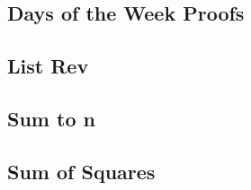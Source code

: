 
\subsection{Days of the Week Proofs} \label{days_proofs}


\newpage
\subsection{List Rev} \label{list_rev}


%

\newpage
\subsection{Sum to n} \label{sum_to_n}


\newpage
\subsection{Sum of Squares} \label{sum_sq}











